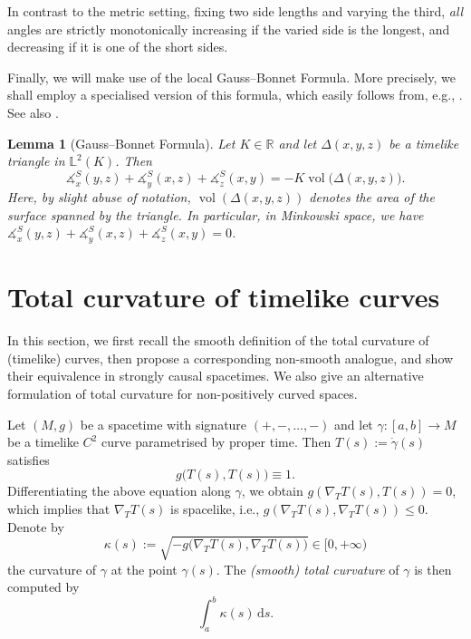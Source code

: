 \documentclass[hidelinks,12pt,a4paper]{article}
\numberwithin{equation}{section}
\theoremstyle{plain}
\newtheorem{lemma}[definition]{Lemma}
\theoremstyle{definition}
\newcommand{\R}{\mathbb R}
\DeclareMathOperator{\vol}{vol}
\newcommand{\lm}[1]{\mathbb{L}^2(#1)}
\newcommand{\ma}{\ensuremath{\measuredangle}}
\begin{document}
In contrast to the metric setting, fixing two side lengths and varying the third, \emph{all} angles are strictly monotonically increasing if the varied side is the longest, and decreasing if it is one of the short sides. 

Finally, we will make use of the local Gauss--Bonnet Formula. 
More precisely, we shall employ a specialised version of this formula, which easily follows from, e.g., \cite[Lemma 3.4]{BBCGRR26+}. 
See also \cite{Jee84}. 

\begin{lemma}[Gauss--Bonnet Formula]
\label{lem: angle sum minkowski}
Let $K \in \R$ and let $\Delta(x,y,z)$ be a timelike triangle in $\lm K$. 
Then 
\begin{equation*}
\ma_x^S(y,z) + \ma_y^S(x,z) + \ma_z^S(x,y) = -K \vol\big(\Delta(x,y,z)\big).
\end{equation*}
Here, by slight abuse of notation, $\vol(\Delta(x,y,z))$ denotes the area of the surface spanned by the triangle. 
In particular, in Minkowski space, we have $\ma_x^S(y,z) + \ma_y^S(x,z) + \ma_z^S(x,y) = 0$. 
\end{lemma}

\section{Total curvature of timelike curves}
\label{compatibility}

In this section, we first recall the smooth definition of the total curvature of (timelike) curves, then propose a corresponding non-smooth analogue, and show their equivalence in strongly causal spacetimes. 
We also give an alternative formulation of total curvature for non-positively curved spaces. 

Let $(M,g)$ be a spacetime with signature $(+, -, \dots, -)$ and let $\gamma\colon  [a,b]\rightarrow M$ be a timelike $C^2$ curve parametrised by proper time. Then $T(s):=\dot\gamma(s)$ satisfies
\begin{equation*}
g\big(T(s),T(s)\big)\equiv 1.
\end{equation*}
Differentiating the above equation along $\gamma$, we obtain $ g(\nabla_TT(s),T(s))=0$, which implies that $\nabla_T T(s)$ is spacelike, i.e., $ g(\nabla_TT(s),\nabla_TT(s))\le 0$. 
Denote by $$\kappa(s):=\sqrt{-g\big(\nabla_TT(s),\nabla_TT(s)\big)}\in [0,+\infty)$$ the curvature of $\gamma$ at the point $\gamma(s)$. The \emph{(smooth) total curvature} of $\gamma$ is then computed by
\begin{equation}
\label{deftc2}
\int_a^b \kappa(s) \,\mathrm{d}s.
\end{equation}
\end{document}
